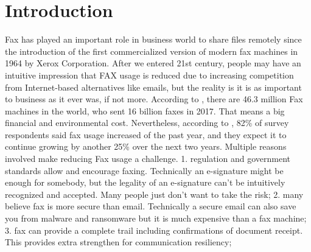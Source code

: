\documentclass[sigconf]{acmart}
\begin{document}
%
%

%

%


%
\maketitle

\section{Introduction}
Fax has played an important role in business world to share files remotely since the introduction of the first commercialized version of modern fax machines in 1964 by Xerox Corporation. After we entered 21st century, people may have an intuitive impression that FAX usage is reduced due to increasing competition from Internet-based alternatives like emails, but the reality is it is as important to business as it ever was, if not more. According to \cite{couponchili2015faxfacts}, there are 46.3 million Fax machines in the world, who sent 16 billion faxes in 2017. That means a big financial and environmental cost. Nevertheless, according to \cite{idc2017faxusagewhitepaper}, 82\% of survey respondents said fax usage increased of the past year, and they expect it to continue growing by another 25\% over the next two years. Multiple reasons involved make reducing Fax usage a challenge.
1. regulation and government standards allow and encourage faxing. Technically an e-signature might be enough for somebody, but the legality of an e-signature can't be intuitively recognized and accepted. Many people just don't want to take the risk;
2. many believe fax is more secure than email. Technically a secure email can also save you from malware and ransomware but it is much expensive than a fax machine;
3. fax can provide a complete trail including confirmations of document receipt. This provides extra strengthen for communication resiliency;
\end{document}
